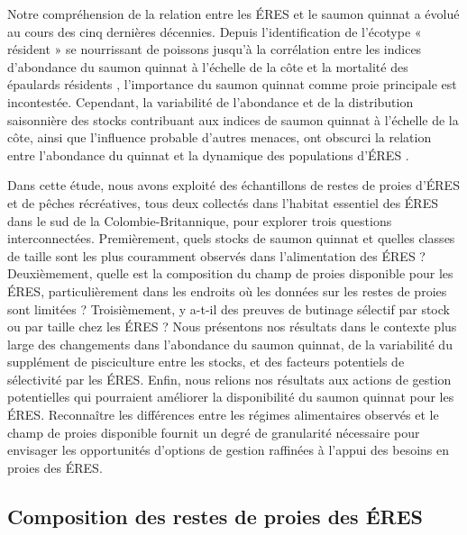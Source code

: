 Notre compréhension de la relation entre les ÉRES et le saumon quinnat a évolué au cours des cinq dernières décennies. Depuis l'identification de l'écotype « résident » se nourrissant de poissons \citep{fordSelectiveForagingFisheating2006} jusqu'à la corrélation entre les indices d'abondance du saumon quinnat à l'échelle de la côte et la mortalité des épaulards résidents \citep{fordChinookSalmonPredation2010}, l'importance du saumon quinnat comme proie principale est incontestée. Cependant, la variabilité de l'abondance et de la distribution saisonnière des stocks contribuant aux indices de saumon quinnat à l'échelle de la côte, ainsi que l'influence probable d'autres menaces, ont obscurci la relation entre l'abondance du quinnat et la dynamique des populations d'ÉRES \citep{velez-espinoRelativeImportanceChinook2015, nelsonIdentifyingDriversDemographic2024, saygiliPrevalenceChinookSalmon2024}.

Dans cette étude, nous avons exploité des échantillons de restes de proies d'ÉRES et de pêches récréatives, tous deux collectés dans l'habitat essentiel des ÉRES dans le sud de la Colombie-Britannique, pour explorer trois questions interconnectées. Premièrement, quels stocks de saumon quinnat et quelles classes de taille sont les plus couramment observés dans l'alimentation des ÉRES ? Deuxièmement, quelle est la composition du champ de proies disponible pour les ÉRES, particulièrement dans les endroits où les données sur les restes de proies sont limitées ? Troisièmement, y a-t-il des preuves de butinage sélectif par stock ou par taille chez les ÉRES ? Nous présentons nos résultats dans le contexte plus large des changements dans l'abondance du saumon quinnat, de la variabilité du supplément de pisciculture entre les stocks, et des facteurs potentiels de sélectivité par les ÉRES. Enfin, nous relions nos résultats aux actions de gestion potentielles qui pourraient améliorer la disponibilité du saumon quinnat pour les ÉRES. Reconnaître les différences entre les régimes alimentaires observés et le champ de proies disponible fournit un degré de granularité nécessaire pour envisager les opportunités d'options de gestion raffinées à l'appui des besoins en proies des ÉRES.

\subsection{Composition des restes de proies des ÉRES}

